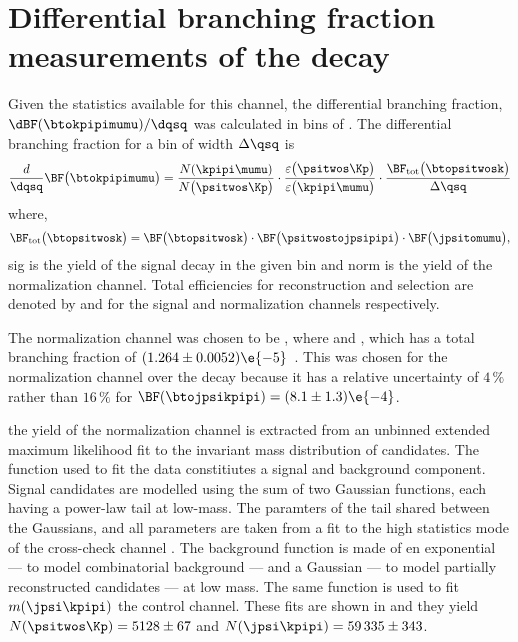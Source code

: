 \section[Differential branching fraction measurements of the decay \btokpipimumu]{
  Differential branching fraction measurements of the decay \tmath{\btokpipimumu}
}

Given the statistics available for this channel, the differential branching fraction,
$\dBF(\btokpipimumu)/\dqsq$ was calculated in bins of \qsq.
The differential branching fraction for a bin of width $\Delta\qsq$ is
\begin{equation}
  \frac{d}{\dqsq}\BF\big(\btokpipimumu\big)
  =
  \frac{N(\kpipi\mumu)}{N\big(\psitwos\Kp\big)} \cdot
  \frac{\varepsilon\big(\psitwos\Kp\big)}{\varepsilon\big(\kpipi\mumu\big)} \cdot
  \frac{\BF_\mathrm{tot}\big(\btopsitwosk\big)}{\Delta\qsq}
  \label{eq:kpipi:diffbf}
\end{equation}
where,
\begin{equation}
  \BF_\mathrm{tot}\big(\btopsitwosk\big)
  =
  \BF\big(\btopsitwosk\big) \cdot
  \BF\big(\psitwostojpsipipi\big) \cdot
  \BF\big(\jpsitomumu\big),
\end{equation}
\num{sig} is the yield of the signal decay \btokpipimumu in the given \qsq bin and \num{norm}
is the yield of the normalization channel.
Total efficiencies for reconstruction and selection are denoted by  and  for the
signal and normalization channels respectively.

The normalization channel was chosen to be \btopsitwosk, where \psitwostojpsipipi and \jpsitomumu,
which has a total branching fraction of $(1.264 \pm 0.0052)\e{-5}$~\cite{PDG2012}.
This was chosen for the normalization channel over the decay \btojpsikpipi because it has a relative
uncertainty of $4\,\%$ rather than $16\,\%$ for $\BF(\btojpsikpipi) = (8.1\pm1.3)\e{-4}$.

the yield  of the normalization channel is extracted from an unbinned extended maximum likelihood
fit to the invariant mass distribution of \btopsitwosk candidates.
The function used to fit the data constitiutes a signal and background component.
Signal candidates are modelled using the sum of two Gaussian functions, each having a power-law
tail at low-mass.
The paramters of the tail shared between the Gaussians, and all parameters are taken from a fit to
the high statistics mode of the cross-check channel \btojpsikpipi.
The background function is made of en exponential --- to model combinatorial background --- and a
Gaussian --- to model partially reconstructed candidates --- at low mass.
The same function is used to fit $m(\jpsi\kpipi)$ the control channel.
These fits are shown in  and they yield
$N(\psitwos\Kp)=5128\pm67$ and $N(\jpsi\kpipi)=59\,335\pm343$.

